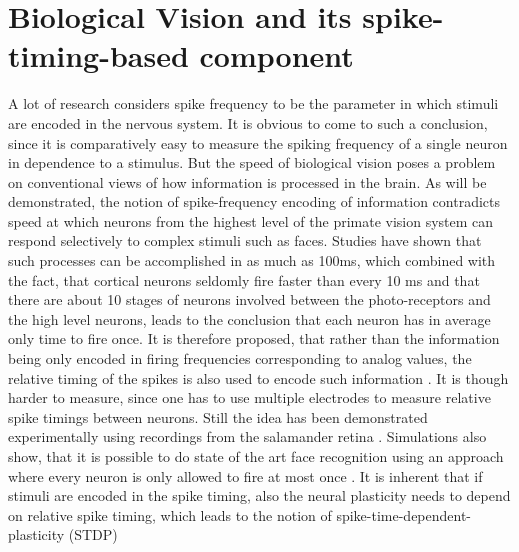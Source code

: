\documentclass{SeminarV2}
\begin{document}
\section{Biological Vision and its spike-timing-based component} 
A lot of research considers spike frequency to be the parameter in which stimuli are encoded in the nervous system. It is obvious to come to such a conclusion, since it is comparatively easy to measure the spiking frequency of a single neuron in dependence to a stimulus.
But the speed of biological vision poses a problem on conventional views of how information is processed in the brain.
As will be demonstrated, the notion of spike-frequency encoding of information contradicts speed at which neurons from the highest level of the primate vision system can respond selectively to complex stimuli such as faces.
Studies have shown that such processes can be accomplished in as much as 100ms, which combined with the fact, that cortical neurons seldomly fire faster than every 10 ms and that there are about 10 stages of neurons involved between the photo-receptors and the high level neurons, leads to the conclusion that each neuron has in average only time to fire once.
It is therefore proposed, that rather than the information being only encoded in firing frequencies corresponding to analog values,
the relative timing of the spikes is also used to encode such information \cite{thorpe_biological_1989} \cite{bialek_reading_1991} \cite{gerstner_why_1993}. It is though harder to measure, since one has to use multiple electrodes to measure relative spike timings between neurons.
Still  the idea has been demonstrated experimentally using recordings from the salamander retina \cite{gollisch_rapid_2008}.
Simulations also show, that it is possible to do state of the art face recognition using an approach 
where every neuron is only allowed to fire at most once \cite{thorpe_spike-based_2012}.
It is inherent that if stimuli are encoded in the spike timing, also the neural plasticity needs to depend on relative spike timing, which leads to the notion of spike-time-dependent-plasticity (STDP)
\end{document}
